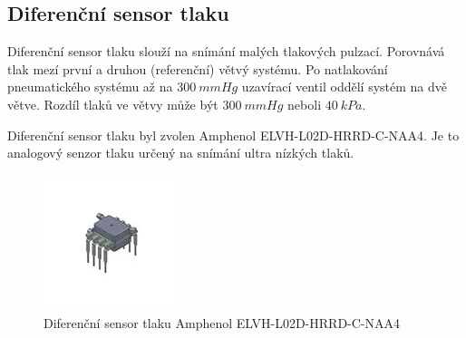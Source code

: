 \subsection{Diferenční sensor tlaku} \label{section:diff_pressure_sen}
Diferenční sensor tlaku slouží na snímání malých tlakových pulzací. Porovnává tlak mezí první a druhou (referenční) větvý systému. Po natlakování pneumatického systému až na $300 \ mmHg$ uzavírací ventil oddělí systém na dvě větve. Rozdíl tlaků ve větvy může být $300 \ mmHg$ neboli $40 \ kPa$. \par
Diferenční sensor tlaku byl zvolen Amphenol ELVH-L02D-HRRD-C-NAA4. Je to analogový senzor tlaku určený na snímání ultra nízkých tlaků.
\begin{figure}[H]
    \centering
    \includegraphics[width=0.3\linewidth]{pictures/amphenol.jpg}
    \caption{Diferenční sensor tlaku Amphenol ELVH-L02D-HRRD-C-NAA4}
    \label{fig:amphenol}
\end{figure}


